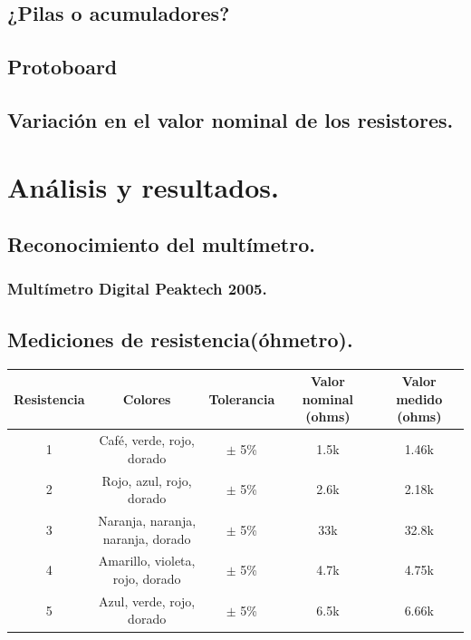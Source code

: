 \documentclass[10pt]{article}
\begin{document}
\begin{multicols}{2}
\subsection{¿Pilas o acumuladores?}


\subsection{Protoboard}

\subsection{Variación en el valor nominal de los resistores.}

\section{Análisis y resultados.}

\subsection{Reconocimiento del multímetro.}
 

\subsubsection{Multímetro Digital Peaktech 2005.}


\subsection{Mediciones de resistencia(óhmetro).}

\begin{center}
	\begin{adjustbox}{width=245pt}
		\begin{tabular}{|c|c|c|c|c|}
			\hline
			Resistencia & Colores & Tolerancia & Valor nominal (ohms) & Valor medido (ohms) \\
			\hline
			1 & Café, verde, rojo, dorado & $\pm$ 5\% & 1.5k & 1.46k \\
			\hline
			2 & Rojo, azul, rojo, dorado & $\pm$ 5\% & 2.6k & 2.18k \\
			\hline
			3 & Naranja, naranja, naranja, dorado & $\pm$ 5\% & 33k & 32.8k \\
			\hline
			4 & Amarillo, violeta, rojo, dorado & $\pm$ 5\% & 4.7k & 4.75k \\
			\hline
			5 & Azul, verde, rojo, dorado & $\pm$ 5\% & 6.5k & 6.66k \\
			\hline
		\end{tabular}
	\end{adjustbox}
\end{center}


\end{multicols}
\end{document}
